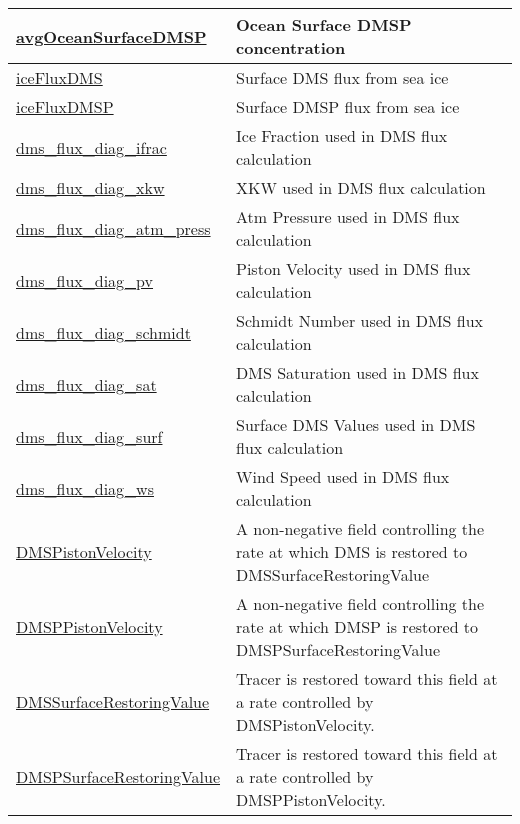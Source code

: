 {\begin{center}
\begin{longtable}{| p{2.0in} | p{4.0in} |}
    \hline
    \hyperref[subsec:var_sec_forcing_avgOceanSurfaceDMSP]{avgOceanSurfaceDMSP} & Ocean Surface DMSP concentration \\
    \hline
    \hyperref[subsec:var_sec_forcing_iceFluxDMS]{iceFluxDMS} & Surface DMS flux from sea ice \\
    \hline
    \hyperref[subsec:var_sec_forcing_iceFluxDMSP]{iceFluxDMSP} & Surface DMSP flux from sea ice \\
    \hline
    \hyperref[subsec:var_sec_forcing_dms_flux_diag_ifrac]{dms\_flux\_diag\_ifrac} & Ice Fraction used in DMS flux calculation \\
    \hline
    \hyperref[subsec:var_sec_forcing_dms_flux_diag_xkw]{dms\_flux\_diag\_xkw} & XKW used in DMS flux calculation \\
    \hline
    \hyperref[subsec:var_sec_forcing_dms_flux_diag_atm_press]{dms\_flux\_diag\_atm\_press} & Atm Pressure used in DMS flux calculation \\
    \hline
    \hyperref[subsec:var_sec_forcing_dms_flux_diag_pv]{dms\_flux\_diag\_pv} & Piston Velocity used in DMS flux calculation \\
    \hline
    \hyperref[subsec:var_sec_forcing_dms_flux_diag_schmidt]{dms\_flux\_diag\_schmidt} & Schmidt Number used in DMS flux calculation \\
    \hline
    \hyperref[subsec:var_sec_forcing_dms_flux_diag_sat]{dms\_flux\_diag\_sat} & DMS Saturation used in DMS flux calculation \\
    \hline
    \hyperref[subsec:var_sec_forcing_dms_flux_diag_surf]{dms\_flux\_diag\_surf} & Surface DMS Values used in DMS flux calculation \\
    \hline
    \hyperref[subsec:var_sec_forcing_dms_flux_diag_ws]{dms\_flux\_diag\_ws} & Wind Speed used in DMS flux calculation \\
    \hline
    \hyperref[subsec:var_sec_forcing_DMSPistonVelocity]{DMSPistonVelocity} & A non-negative field controlling the rate at which DMS is restored to DMSSurfaceRestoringValue \\
    \hline
    \hyperref[subsec:var_sec_forcing_DMSPPistonVelocity]{DMSPPistonVelocity} & A non-negative field controlling the rate at which DMSP is restored to DMSPSurfaceRestoringValue \\
    \hline
    \hyperref[subsec:var_sec_forcing_DMSSurfaceRestoringValue]{DMSSurfaceRestoringValue} & Tracer is restored toward this field at a rate controlled by DMSPistonVelocity. \\
    \hline
    \hyperref[subsec:var_sec_forcing_DMSPSurfaceRestoringValue]{DMSPSurfaceRestoringValue} & Tracer is restored toward this field at a rate controlled by DMSPPistonVelocity. \\

\end{longtable}
\end{center}}
